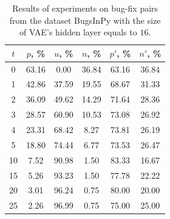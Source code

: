 \documentclass[10pt,conference]{IEEEtran}
\begin{document}

\begin{table}[]
\caption{Results of experiments on bug-fix pairs from the dataset BugsInPy with the size of VAE's hidden layer equals to $16$.}\label{bugsinpy16}
\begin{tabular}{|c||c|c|c||c|c|}
\hline
$t$       & $p$, \%& $u$, \% & $n$, \%  & $p'$, \%& $n'$, \% \\ \hline
0         & 63.16  & 0.00  & 36.84  & 63.16 & 36.84 \\ \hline
1         & 42.86  & 37.59 & 19.55  & 68.67 & 31.33 \\ \hline
2         & 36.09  & 49.62 & 14.29  & 71.64 & 28.36 \\ \hline
3         & 28.57  & 60.90 & 10.53  & 73.08 & 26.92 \\ \hline
4         & 23.31  & 68.42 & 8.27   & 73.81 & 26.19 \\ \hline
5         & 18.80  & 74.44 & 6.77   & 73.53 & 26.47 \\ \hline
10        & 7.52   & 90.98 & 1.50   & 83.33 & 16.67 \\ \hline
15        & 5.26   & 93.23 & 1.50   & 77.78 & 22.22 \\ \hline
20        & 3.01   & 96.24 & 0.75   & 80.00 & 20.00 \\ \hline
25        & 2.26   & 96.99 & 0.75   & 75.00 & 25.00 \\ \hline
\end{tabular}
\end{table}
\end{document}

